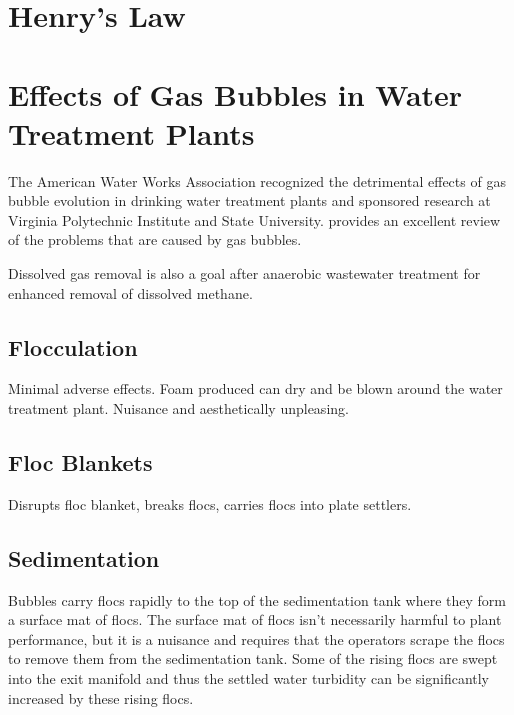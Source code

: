 \documentclass[letterpaper,10pt,english]{sphinxmanual}
\begin{document}
{\section{Henry’s Law}
\label{\detokenize{Dissolved_Gas/DG_Intro:henry-s-law}}\label{\detokenize{Dissolved_Gas/DG_Intro:heading-henrys-law}}

\section{Effects of Gas Bubbles in Water Treatment Plants}
\label{\detokenize{Dissolved_Gas/DG_Intro:effects-of-gas-bubbles-in-water-treatment-plants}}\label{\detokenize{Dissolved_Gas/DG_Intro:heading-effects-of-gas-bubbles-in-water-treatment-plants}}
The American Water Works Association recognized the detrimental effects of gas bubble evolution in drinking water treatment plants and sponsored research at Virginia Polytechnic Institute and State University.  provides an excellent review of the problems that are caused by gas bubbles.

Dissolved gas removal is also a goal after anaerobic wastewater treatment for enhanced removal of dissolved methane.


\subsection{Flocculation}
\label{\detokenize{Dissolved_Gas/DG_Intro:flocculation}}\label{\detokenize{Dissolved_Gas/DG_Intro:heading-dg-flocculation}}
Minimal adverse effects. Foam produced can dry and be blown around the water treatment plant. Nuisance and aesthetically unpleasing.


\subsection{Floc Blankets}
\label{\detokenize{Dissolved_Gas/DG_Intro:floc-blankets}}\label{\detokenize{Dissolved_Gas/DG_Intro:heading-dg-floc-blankets}}
Disrupts floc blanket, breaks flocs, carries flocs into plate settlers.


\subsection{Sedimentation}
\label{\detokenize{Dissolved_Gas/DG_Intro:sedimentation}}\label{\detokenize{Dissolved_Gas/DG_Intro:heading-dg-sedimentation}}
Bubbles carry flocs rapidly to the top of the sedimentation tank where they form a surface mat of flocs. The surface mat of flocs isn’t necessarily harmful to plant performance, but it is a nuisance and requires that the operators scrape the flocs to remove them from the sedimentation tank. Some of the rising flocs are swept into the exit manifold and thus the settled water turbidity can be significantly increased by these rising flocs.


}
\end{document}
